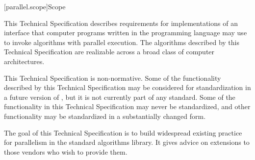 
[parallel.scope]{Scope}

\pnum
This Technical Specification describes requirements for implementations of an
interface that computer programs written in the \Cpp programming language may
use to invoke algorithms with parallel execution. The algorithms described by
this Technical Specification are realizable across a broad class of
computer architectures.

\pnum
This Technical Specification is non-normative. Some of the functionality
described by this Technical Specification may be considered for standardization
in a future version of \Cpp, but it is not currently part of any \Cpp standard.
Some of the functionality in this Technical Specification may never be
standardized, and other functionality may be standardized in a substantially
changed form.

\pnum
The goal of this Technical Specification is to build widespread existing
practice for parallelism in the \Cpp standard algorithms library. It gives
advice on extensions to those vendors who wish to provide them.
